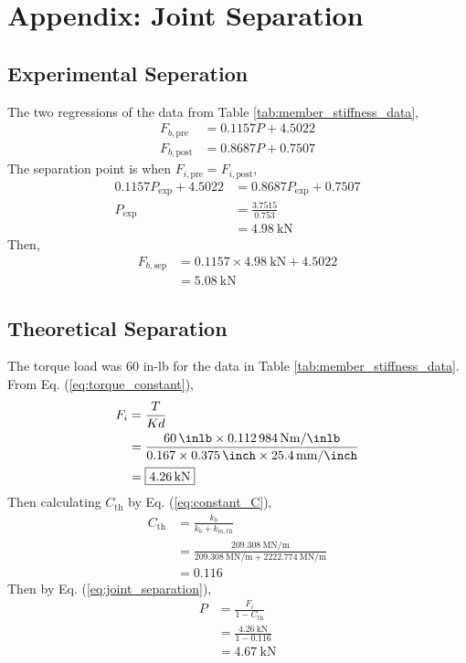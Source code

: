 \section{Appendix: Joint Separation}
\label{app:joint_seperation}

\subsection{Experimental Seperation}
The two regressions of the data from Table \ref{tab:member_stiffness_data}, 
\begin{align*}
    F_{b, \text{pre}} &= 0.1157 P + 4.5022 \\
    F_{b, \text{post}} &= 0.8687 P + 0.7507
\end{align*}
The separation point is when $F_{i, \text{pre}} = F_{i, \text{post}}$, 
\begin{align*}
    0.1157 P_{\text{exp}} + 4.5022 &= 0.8687 P_{\text{exp}} + 0.7507 \\
    P_{\text{exp}} &= \frac{3.7515}{0.753} \\
    &= \boxed{\qty{4.98}{\kilo\newton}} 
\end{align*}
Then,
\begin{align*}
    F_{b, \text{sep}} &= 0.1157 \times \qty{4.98}{\kilo\newton} + 4.5022 \\
    &= \boxed{\qty{5.08}{\kilo\newton}}
\end{align*}

\subsection{Theoretical Separation}
The torque load was 60 in-lb for the data in Table \ref{tab:member_stiffness_data}. From Eq. (\ref{eq:torque_constant}), 
\begin{align*}
    F_i &= \frac{T}{Kd} \\
    &= \frac{\qty{60}{\inlb} \times \qty{0.112984}{\newton\meter\per\inlb}}{0.167 \times \qty{0.375}{\inch} \times \qty{25.4}{\milli\meter\per\inch}} \\
    &= \boxed{\qty{4.26}{\kilo\newton}}
\end{align*}
Then calculating $C_{\text{th}}$ by Eq. (\ref{eq:constant_C}),
\begin{align*}
    C_{\text{th}} &= \frac{k_b}{k_b + k_{m, \text{th}}} \\
    &= \frac{\qty{209.308}{\mega\newton\per\meter}}{\qty{209.308}{\mega\newton\per\meter} + \qty{2222.774}{\mega\newton\per\meter}} \\
    &= 0.116
\end{align*}
Then by Eq. (\ref{eq:joint_separation}),
\begin{align*}
    P &= \frac{F_i}{1-C_{\text{th}}} \\
    &= \frac{\qty{4.26}{\kilo\newton}}{1-0.116} \\
    &= \boxed{\qty{4.67}{\kilo\newton}}
\end{align*}

